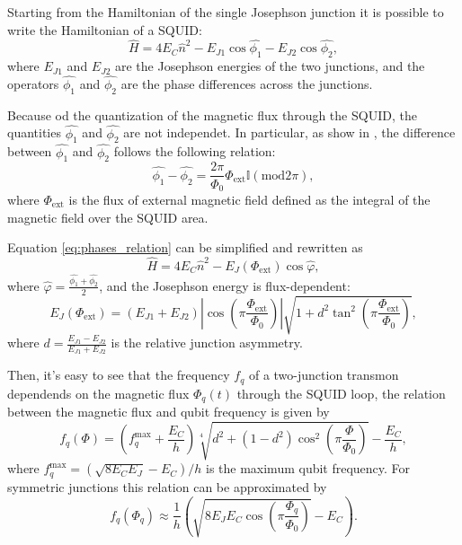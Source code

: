Starting from the Hamiltonian of the single Josephson junction it is possible to write the Hamiltonian of a SQUID:
\begin{equation}\label{eq:SQUID_Hamiltonian}
    \hat{H} = 4E_C\hat{n}^2 - E_{J1}\cos{\hat{\phi_1}} - E_{J2}\cos{\hat{\phi_2}},
\end{equation}
where $E_{J1}$ and $E_{J2}$ are the Josephson energies of the two junctions, and the operators $\hat{\phi_1}$ and $\hat{\phi_2}$ are the phase differences across the junctions.

Because od the quantization of the magnetic flux through the SQUID, the quantities $\hat{\phi_1}$ and $\hat{\phi_2}$ are not independet. 
In particular, as show in \cite{manenti_quantum_2023}, the difference between $\hat{\phi_1}$ and $\hat{\phi_2}$ follows the following relation:
\begin{equation}\label{eq:phases_relation}
    \hat{\phi_1} - \hat{\phi_2} = \frac{2\pi}{\Phi_0}\Phi_{\text{ext}}\mathbb{I}(\text{mod}2\pi),
\end{equation}
where $\Phi_{\text{ext}}$ is the flux of external magnetic field defined as the integral of the magnetic field over the SQUID area.

Equation \ref{eq:phases_relation} can be simplified and rewritten as 
\begin{equation}\label{eq:tunable_transmon_hamiltonian}
    \hat{H} = 4E_C\hat{n}^2 - E_J(\Phi_{\text{ext}})\cos{\hat{\varphi}},
\end{equation}
where $\hat{\varphi} = \frac{\hat{\phi_1}+\hat{\phi_2}}{2}$, and the Josephson energy is flux-dependent: 
\begin{equation}\label{eq:EJ_tunable}
    E_J(\Phi_{\text{ext}}) = (E_{J1} + E_{J2}) \left| \cos \left( \pi \frac{\Phi_{\text{ext}}}{\Phi_0} \right) \right| \sqrt{1 + d^2 \tan^2 \left( \pi \frac{\Phi_{\text{ext}}}{\Phi_0} \right) },
\end{equation}
where $d = \frac{E_{J1}-E_{J2}}{E_{J1}+E_{J2}}$ is the relative junction asymmetry.

Then, it's easy to see that the frequency $f_q$ of a two-junction transmon dependends on the magnetic flux $\Phi_q(t)$ through the SQUID loop, the relation between the magnetic flux and qubit frequency is given by \cite{PhysRevApplied.20.024070}
\begin{equation}\label{eq:freqdepndenceonflux}
    f_q(\Phi) = \left( f_q^{\text{max}} + \frac{E_C}{h} \right) \sqrt[4]{d^2 + (1 - d^2) \cos^2 \left( \pi \frac{\Phi}{\Phi_0} \right)} - \frac{E_C}{h},
\end{equation}
where $f_q^{\text{max}} = (\sqrt{8E_C E_J}-E_C)/h$ is the maximum qubit frequency. For symmetric junctions this relation can be approximated by \cite{rol_time-domain_2020}
\begin{equation}\label{eq:freqdepndenceonflux_approx}
    f_q(\Phi_q) \approx \frac{1}{h} \left( \sqrt{8E_J E_C \cos\left(\pi \frac{\Phi_q}{\Phi_0} \right)} - E_C \right).    
\end{equation}

